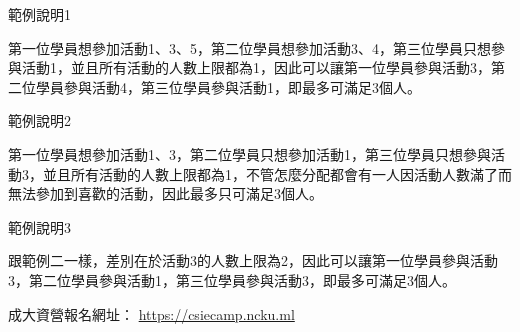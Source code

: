 \large{範例說明1}

第一位學員想參加活動1、3、5，第二位學員想參加活動3、4，第三位學員只想參與活動1，並且所有活動的人數上限都為1，因此可以讓第一位學員參與活動3，第二位學員參與活動4，第三位學員參與活動1，即最多可滿足3個人。

\large{範例說明2}

第一位學員想參加活動1、3，第二位學員只想參加活動1，第三位學員只想參與活動3，並且所有活動的人數上限都為1，不管怎麼分配都會有一人因活動人數滿了而無法參加到喜歡的活動，因此最多只可滿足3個人。

\large{範例說明3}

跟範例二一樣，差別在於活動3的人數上限為2，因此可以讓第一位學員參與活動3，第二位學員參與活動1，第三位學員參與活動3，即最多可滿足3個人。

成大資營報名網址：
\url{https://csiecamp.ncku.ml}
